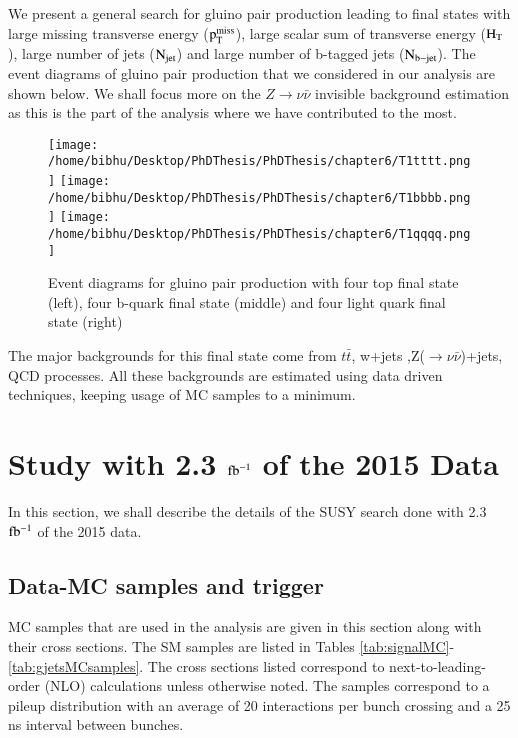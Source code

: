 We present a general search for gluino pair production leading to final states with large missing transverse energy ($\rm p_{T}^{miss}$), large scalar sum of transverse energy ($\rm H_{T}$), large number of jets ($\rm N_{jet}$) and large number of b-tagged jets ($\rm N_{b-jet}$). The event diagrams of gluino pair production that we considered in our analysis are shown below. We shall focus more on the $Z\rightarrow \nu \bar{\nu} $ invisible background estimation as this is the part of the analysis where we have contributed to the most. 


\begin{figure}[H]
    \centering
    \texttt{[image: /home/bibhu/Desktop/PhDThesis/PhDThesis/chapter6/T1tttt.png]}
    \texttt{[image: /home/bibhu/Desktop/PhDThesis/PhDThesis/chapter6/T1bbbb.png]}
    \texttt{[image: /home/bibhu/Desktop/PhDThesis/PhDThesis/chapter6/T1qqqq.png]}
    \caption{ \small Event diagrams for gluino pair production with four top final state (left), four b-quark final state (middle) and four light quark final state (right)}
    \label{fig:SMSSUSYeventDiagrams}
\end{figure}


The major backgrounds for this final state come from $t\bar{t}$, w+jets ,Z($\rightarrow \nu\bar{\nu}$)+jets, QCD processes. All these backgrounds are estimated using data driven techniques, keeping usage of MC samples to a minimum. 

\section{Study with 2.3 $\rm fb^{-1}$ of the 2015 Data}

In this section, we shall describe the details of the SUSY search done with 2.3 $\rm fb^{-1}$ of the 2015 data.

\subsection{Data-MC samples and trigger}

MC samples that are used in the analysis are given in this section along with their cross sections. 
The SM samples are listed in Tables \ref{tab:signalMC}-\ref{tab:gjetsMCsamples}.  The cross
sections listed correspond to next-to-leading-order (NLO) calculations 
unless otherwise noted.  The samples correspond to a
pileup distribution with an average of 20 interactions per
bunch crossing and a 25 ns interval between bunches.


